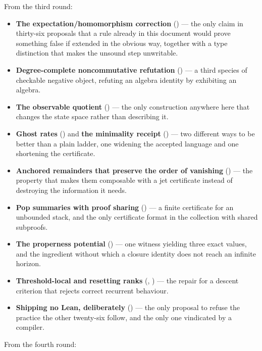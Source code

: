 From the third round:

\begin{itemize}[leftmargin=1.4em]
\item \textbf{The expectation/homomorphism correction} () --- the only
  claim in thirty-six proposals that a rule already in this document would
  prove something false if extended in the obvious way, together with a type
  distinction that makes the unsound step unwritable.
\item \textbf{Degree-complete noncommutative refutation} () --- a
  third species of checkable negative object, refuting an algebra identity by
  exhibiting an algebra.
\item \textbf{The observable quotient} () --- the only construction
  anywhere here that changes the state space rather than describing it.
\item \textbf{Ghost rates} () and \textbf{the minimality receipt}
  () --- two different ways to be better than a plain ladder, one
  widening the accepted language and one shortening the certificate.
\item \textbf{Anchored remainders that preserve the order of vanishing}
  () --- the property that makes them composable with a jet certificate
  instead of destroying the information it needs.
\item \textbf{Pop summaries with proof sharing} () --- a finite
  certificate for an unbounded stack, and the only certificate format in the
  collection with shared subproofs.
\item \textbf{The properness potential} () --- one witness yielding
  three exact values, and the ingredient without which a closure identity does
  not reach an infinite horizon.
\item \textbf{Threshold-local and resetting ranks} (, ) ---
  the repair for a descent criterion that rejects correct recurrent behaviour.
\item \textbf{Shipping no Lean, deliberately} () --- the only
  proposal to refuse the practice the other twenty-six follow, and the only one
  vindicated by a compiler.
\end{itemize}

From the fourth round:

